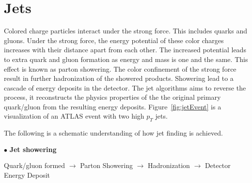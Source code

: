 %
%
%
%
%
%

\section{Jets}
\label{sec:Jet}
Colored charge particles interact under the strong force. This includes quarks and gluons. Under the strong force, the energy potential of these color charges increases with their distance apart from each other. The increased potential leads to extra quark and gluon formation as energy and mass is one and the same. This effect is known as parton showering. The color confinement of the strong force result in further hadronization of the showered products.
Showering lead to a cascade of energy deposits in the detector. The jet algorithms aims to reverse the process, it reconstructs the physics properties of the the original primary quark/gluon from the resulting energy deposits. Figure~\ref{fig:jetEvent} is a visualization of an ATLAS event with two high $p_{T}$ jets.

The following is a schematic understanding of how jet finding is achieved. 

$\bullet$ \textbf{Jet showering}

Quark/gluon formed $\rightarrow$  Parton Showering $\rightarrow$ Hadronization $\rightarrow$ Detector Energy Deposit

